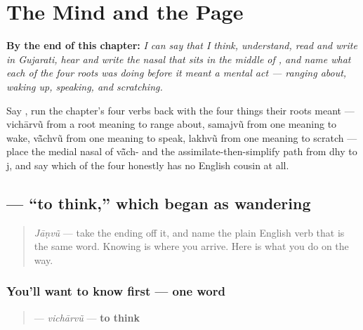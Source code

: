 
\chapter{The Mind and the Page}
\label{ch:gu-mind-and-page}

\begin{chapteropening}
\textbf{By the end of this chapter:} \emph{I can say that I think, understand, read and write in Gujarati, hear and write the nasal that sits in the middle of , and name what each of the four roots was doing before it meant a mental act — ranging about, waking up, speaking, and scratching.}

Say     , run the chapter's four verbs back with the four things their roots meant — vichārvũ from a root meaning to range about, samajvũ from one meaning to wake, vā̃chvũ from one meaning to speak, lakhvũ from one meaning to scratch — place the medial nasal of vā̃ch- and the assimilate-then-simplify path from dhy to j, and say which of the four honestly has no English cousin at all.
\end{chapteropening}

\section[\texorpdfstring{\gu{વિચારવું} (vichārvũ)}{વિચારવું (vichārvũ)}]{ — \textquotedblleft{}to think,\textquotedblright{} which began as wandering}

\label{lesson:GU-C08-vicharvun}



\begin{quote}
\emph{Jāṇvũ} — take the ending off it, and name the plain English verb that is the same word. Knowing is where you arrive. Here is what you do on the way.
\end{quote}

\subsection*{You'll want to know first — one word}
\begin{quote}
\textbf{} — \emph{vichārvũ} — \textbf{to think}
\end{quote}

